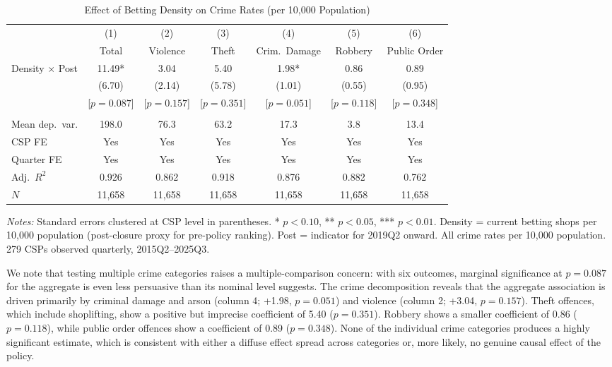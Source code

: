 \documentclass[12pt]{article}
\begin{document}
\begin{table}[H]
\centering
\caption{Effect of Betting Density on Crime Rates (per 10,000 Population)}
\label{tab:main}
\begin{adjustbox}{max width=\textwidth}
\begin{threeparttable}
\begin{tabular}{lcccccc}
\toprule
& (1) & (2) & (3) & (4) & (5) & (6) \\
& Total & Violence & Theft & Crim.\ Damage & Robbery & Public Order \\
\midrule
Density $\times$ Post & 11.49* & 3.04 & 5.40 & 1.98* & 0.86 & 0.89 \\
& (6.70) & (2.14) & (5.78) & (1.01) & (0.55) & (0.95) \\
& [$p = 0.087$] & [$p = 0.157$] & [$p = 0.351$] & [$p = 0.051$] & [$p = 0.118$] & [$p = 0.348$] \\
\\
Mean dep.\ var. & 198.0 & 76.3 & 63.2 & 17.3 & 3.8 & 13.4 \\
CSP FE & Yes & Yes & Yes & Yes & Yes & Yes \\
Quarter FE & Yes & Yes & Yes & Yes & Yes & Yes \\
Adj.\ $R^2$ & 0.926 & 0.862 & 0.918 & 0.876 & 0.882 & 0.762 \\
$N$ & 11,658 & 11,658 & 11,658 & 11,658 & 11,658 & 11,658 \\
\bottomrule
\end{tabular}
\begin{tablenotes}[flushleft]
\small
\item \textit{Notes:} Standard errors clustered at CSP level in parentheses. * $p<0.10$, ** $p<0.05$, *** $p<0.01$. Density = current betting shops per 10,000 population (post-closure proxy for pre-policy ranking). Post = indicator for 2019Q2 onward. All crime rates per 10,000 population. 279 CSPs observed quarterly, 2015Q2--2025Q3.
\end{tablenotes}
\end{threeparttable}
\end{adjustbox}
\end{table}

We note that testing multiple crime categories raises a multiple-comparison concern: with six outcomes, marginal significance at $p = 0.087$ for the aggregate is even less persuasive than its nominal level suggests. The crime decomposition reveals that the aggregate association is driven primarily by criminal damage and arson (column 4; +1.98, $p = 0.051$) and violence (column 2; +3.04, $p = 0.157$). Theft offences, which include shoplifting, show a positive but imprecise coefficient of 5.40 ($p = 0.351$). Robbery shows a smaller coefficient of 0.86 ($p = 0.118$), while public order offences show a coefficient of 0.89 ($p = 0.348$). None of the individual crime categories produces a highly significant estimate, which is consistent with either a diffuse effect spread across categories or, more likely, no genuine causal effect of the policy.
\end{document}
